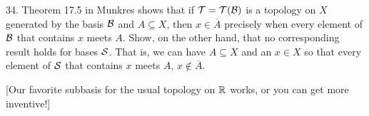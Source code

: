 \documentclass[12]{article}
\begin{document}
\begin{description}
\msk

\item{34.} Theorem 17.5 in Munkres shows that if ${\mathcal T}={\mathcal T}({\mathcal B})$ is a topology on $X$ generated by the basis ${\mathcal B}$ and 
$A\subseteq X$, then $x\in\overline{A}$ precisely when every element of ${\mathcal B}$ that contains $x$ meets $A$.
Show, on the other hand, that no corresponding result holds for bases ${\mathcal S}$. That is, we can have
$A\subseteq X$ and an $x\in X$ so that every element of ${\mathcal S}$ that contains $x$ meets $A$, 
$x\not\in\overline{A}$.

\ssk

\item{\spc} [Our favorite subbasis for the usual topology on ${\mathbb R}$ works, or you can get
more inventive!]


\end{description}
\vfill
\end{document}
